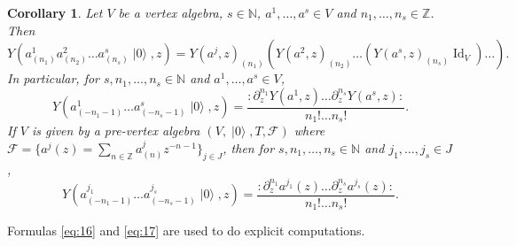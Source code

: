 \documentclass[a4paper, 12pt, reqno]{amsart}
\newtheorem{corollary}[theorem]{Corollary}
\theoremstyle{remark}
\numberwithin{equation}{subsection}
\DeclareMathOperator{\Id}{Id}
\DeclareMathOperator{\vac}{|0\rangle}
\begin{document}
\begin{corollary}
  \label{crl:1}
  Let $V$ be a vertex algebra, $s \in \mathbb{N}$, $a^1, \dots, a^s \in V$ and $n_1, \dots, n_s \in \mathbb{Z}$.
  Then 
  \begin{equation*}
    Y(a^1_{(n_1)}a^2_{(n_2)}\dots a^s_{(n_s)}\vac, z) = Y(a^j, z)_{(n_1)}(Y(a^2, z)_{(n_2)}\dots (Y(a^s, z)_{(n_s)}\Id_V)\dots).
  \end{equation*}
  In particular, for $s, n_1, \dots, n_s \in \mathbb{N}$ and $a^1, \dots, a^s \in V$,
  \begin{equation}
    \label{eq:16}
    Y(a^1_{(-n_1 - 1)}\dots a^s_{(-n_s - 1)}\vac, z) = \frac{:\partial^{n_1}_zY(a^1,z)\dots \partial^{n_s}_zY(a^s,z):}{n_1!\dots n_s!}.
  \end{equation}
  If $V$ is given by a pre-vertex algebra $(V, \vac, T, \mathcal{F})$ where $\mathcal{F} = \{a^j(z) = \sum_{n \in \mathbb{Z}}a^j_{(n)}z^{-n - 1}\}_{j \in J}$, then for $s, n_1, \dots, n_s \in \mathbb{N}$ and $j_1, \dots, j_s \in J$,
  \begin{equation}
    \label{eq:17}
    Y(a^{j_1}_{(-n_1 - 1)}\dots a^{j_s}_{(-n_s - 1)}\vac, z) = \frac{:\partial^{n_1}_za^{j_1}(z)\dots \partial^{n_s}_za^{j_s}(z):}{n_1!\dots n_s!}.
  \end{equation}
\end{corollary}

Formulas \eqref{eq:16} and \eqref{eq:17} are used to do explicit computations.

\printindex



\end{document}
